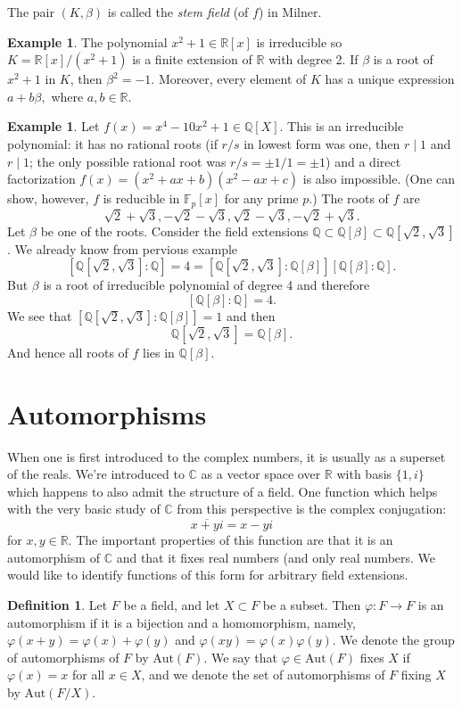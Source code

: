 \documentclass[12pt]{report}
\theoremstyle{definition}
\newtheorem{defn}[thm]{Definition}
\newtheorem{example}[thm]{Example}
\def\CC{\mathbb{C}}
\def\QQ{\mathbb{Q}}
\def\RR{\mathbb{R}}
\def\FF{\mathbb{F}}
\def\Aut{\text{Aut}}
\def\bb{\beta}
\begin{document}
\begin{remark}
    The pair $(K,\bb)$ is called the \emph{stem field} (of $f$) in Milner.
\end{remark}

\begin{example}
    The polynomial $x^2+1\in \RR[x]$ is irreducible so $K=\RR[x]/(x^2+1)$ is a finite extension of $\RR$ with degree 2. If $\bb$ is a root of $x^2+1$ in $K$, then $\bb^2=-1$. Moreover, every element of $K$ has a unique expression $a+b\bb,$ where $a,b\in \RR$.
\end{example}

\begin{example}
    Let $f(x)= x^4-10x^2+1\in \QQ[X]$. This is an irreducible polynomial: it has no rational roots (if $r/s$ in lowest form was one, then $r\mid 1$ and $r\mid 1$; the only possible rational root was $r/s =\pm 1/1=\pm 1$) and a direct factorization $f(x)=(x^2+ax+b)(x^2-ax+c)$ is also impossible. (One can show, however, $f$ is reducible in $\FF_p[x]$ for any prime $p$.) The roots of $f$ are $$\sqrt{2}+\sqrt{3}, -\sqrt{2}-\sqrt{3}, \sqrt{2}-\sqrt{3}, -\sqrt{2}+\sqrt{3}.$$
    Let $\bb$ be one of the roots. Consider the field extensions $\QQ\subset\QQ[\bb]\subset \QQ[\sqrt{2},\sqrt{3}]$. We already know from pervious example $$[\QQ[\sqrt{2},\sqrt{3}]:\QQ]=4=[\QQ[\sqrt{2},\sqrt{3}]:\QQ[\bb]][\QQ[\bb]:\QQ].$$ But $\bb$ is a root of irreducible polynomial of degree 4 and therefore $$[\QQ[\bb]:\QQ]=4.$$
    We see that $[\QQ[\sqrt{2},\sqrt{3}]:\QQ[\bb]]=1$ and then $$\QQ[\sqrt{2},\sqrt{3}]=\QQ[\bb].$$ 
    And hence all roots of $f$ lies in $\QQ[\bb]$.
\end{example}

\section{Automorphisms}
When one is first introduced to the complex numbers, it is usually as a superset of the reals. We're introduced to $\CC$ as a vector space over $\RR$ with basis $\{1,i\}$ which happens to also admit the structure of a field. One function which helps with the very basic study of $\CC$ from this perspective is the complex conjugation: $$\overline{x+yi}=x-yi$$ for $x,y\in \RR$. The important properties of this function are that it is an automorphism of $\CC$ and that it fixes real numbers (and only real numbers. We would like to identify functions of this form for arbitrary field extensions.

\begin{defn}
    Let $F$ be a field, and let $X \subset F$ be a subset. Then $\varphi: F \to F$ is an automorphism if it is a bijection and a homomorphism, namely, $\varphi(x+y)=\varphi(x)+\varphi(y)$ and $\varphi(xy)=\varphi(x)\varphi(y)$. We denote the group of automorphisms of $F$ by $\Aut(F)$. We say that $\varphi\in \Aut(F)$ fixes $X$ if $\varphi(x) = x$ for all $x \in X$, and we denote the set of automorphisms of $F$ fixing $X$ by $\Aut(F/X)$.
\end{defn}
\end{document}
